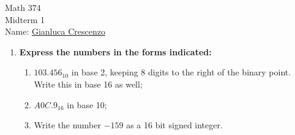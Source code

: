 \documentclass[12pt,twoside,openany]{memoir}
\begin{document}
\begin{center}
{\large Math 374 \\[0.1in]Midterm 1 \\[0.1in]}
{Name:} {\underline{Gianluca Crescenzo\hspace*{2in}}}\\[0.15in]
\end{center}
\vspace{4pt}
\begin{enumerate}[label = \arabic*.]
    \item \textbf{Express the numbers in the forms indicated:}
        \begin{enumerate}[label = (\alph*)]
            \item $103.456_{10}$ in base 2, keeping 8 digits to the right of the binary point. Write this in base 16 as well;
            \item $A0C.9_{16}$ in base 10;
            \item Write the number $-159$ as a 16 bit signed integer.
        \end{enumerate}
\end{enumerate}
\end{document}
